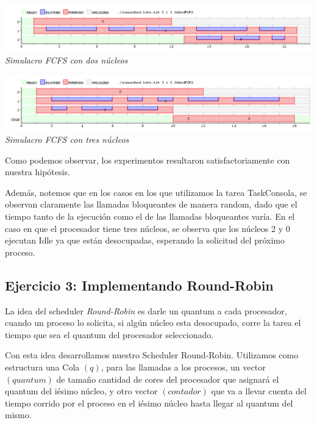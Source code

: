 \vspace{\baselineskip}
\begin{center}
\includegraphics[scale=0.45]{../tp1/Test/resEj2Co2.png}
\\
\vspace{1pt}
\footnotesize\textit{Simulacro FCFS con dos n\'ucleos}
\end{center}
\vspace{\baselineskip}

\vspace{\baselineskip}
\begin{center}
\includegraphics[scale=0.45]{../tp1/Test/resEj2Co3.png}
\\
\vspace{1pt}
\footnotesize\textit{Simulacro FCFS con tres n\'ucleos}
\end{center}
\vspace{\baselineskip}


Como podemos observar, los experimentos resultaron satisfactoriamente con nuestra hip\'otesis.

Adem\'as, notemos que en los casos en los que utilizamos la tarea TaskConsola, se observan claramente
las llamadas bloqueantes de manera random, dado que el tiempo tanto de la ejecuci\'on como el de las llamadas bloqueantes var\'ia.
En el caso en que el procesador tiene tres n\'ucleos, se observa que los n\'ucleos 2 y 0 ejecutan 
Idle ya que est\'an desocupadas, esperando la solicitud del pr\'oximo proceso.

\subsection{Ejercicio 3: Implementando Round-Robin}
La idea del scheduler \textit{Round-Robin} es darle un quantum a cada procesador, cuando un proceso lo solicita,
si alg\'un n\'ucleo esta desocupado, corre la tarea el tiempo que sea el quantum del procesador seleccionado.

Con esta idea desarrollamos nuestro Scheduler Round-Robin. Utilizamos como estructura una Cola $(q)$, para las llamadas a los procesos, 
un vector $(quantum)$ de tama\~no cantidad de cores del procesador que asignar\'a el quantum del i\'esimo n\'ucleo, 
y otro vector $(contador)$ que va a llevar cuenta del tiempo corrido por el proceso en el i\'esimo n\'ucleo hasta llegar al quantum del mismo.


